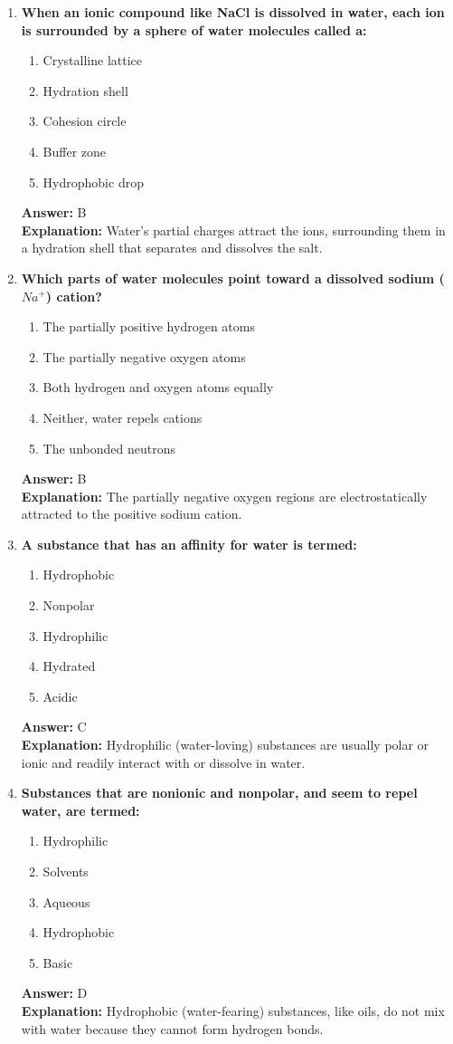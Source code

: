 \documentclass[11pt, a4paper]{article}
\begin{document}
\begin{enumerate}
\item \textbf{When an ionic compound like NaCl is dissolved in water, each ion is surrounded by a sphere of water molecules called a:}
\begin{enumerate}[label=\Alph*.]
    \item Crystalline lattice
    \item Hydration shell
    \item Cohesion circle
    \item Buffer zone
    \item Hydrophobic drop
\end{enumerate}
\textbf{Answer:} B \\
\textbf{Explanation:} Water's partial charges attract the ions, surrounding them in a hydration shell that separates and dissolves the salt.

\item \textbf{Which parts of water molecules point toward a dissolved sodium ($Na^+$) cation?}
\begin{enumerate}[label=\Alph*.]
    \item The partially positive hydrogen atoms
    \item The partially negative oxygen atoms
    \item Both hydrogen and oxygen atoms equally
    \item Neither, water repels cations
    \item The unbonded neutrons
\end{enumerate}
\textbf{Answer:} B \\
\textbf{Explanation:} The partially negative oxygen regions are electrostatically attracted to the positive sodium cation.

\item \textbf{A substance that has an affinity for water is termed:}
\begin{enumerate}[label=\Alph*.]
    \item Hydrophobic
    \item Nonpolar
    \item Hydrophilic
    \item Hydrated
    \item Acidic
\end{enumerate}
\textbf{Answer:} C \\
\textbf{Explanation:} Hydrophilic (water-loving) substances are usually polar or ionic and readily interact with or dissolve in water.

\item \textbf{Substances that are nonionic and nonpolar, and seem to repel water, are termed:}
\begin{enumerate}[label=\Alph*.]
    \item Hydrophilic
    \item Solvents
    \item Aqueous
    \item Hydrophobic
    \item Basic
\end{enumerate}
\textbf{Answer:} D \\
\textbf{Explanation:} Hydrophobic (water-fearing) substances, like oils, do not mix with water because they cannot form hydrogen bonds.


\end{enumerate}
\end{document}
